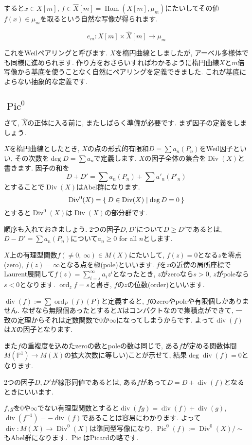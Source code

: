 \documentclass{jsarticle}
\newcommand{\PP}{\mathbb{P}}
\newcommand{\makeop}[1]{\mathop{\mathrm{#1}}\nolimits}
\def\Hom{\makeop{Hom}}
\def\Pic{\makeop{Pic}}
\def\Div{\makeop{Div}}
\def\div{\makeop{div}}
\def\ord{\makeop{ord}}
\theoremstyle{definition}
\numberwithin{theorem}{section}
\begin{document}
すると$x \in X[m]$, $f \in \hat{X}[m] = \Hom(X[m], \mu_m)$にたいしてその値$f(x) \in \mu_m$を取るという自然な写像が得られます.

\begin{equation*}
e_m: X[m] \times \hat{X}[m] \rightarrow \mu_m
\end{equation*}

これをWeilペアリングと呼びます. $X$を楕円曲線としましたが, アーベル多様体でも同様に進められます. 作り方をおさらいすればわかるように楕円曲線$X$と$m$倍写像から基底を使うことなく自然にペアリングを定義できました. これが基底によらない抽象的な定義です.

\subsection{$\Pic^0$}
さて, $\hat{X}$の正体に入る前に, またしばらく準備が必要です. まず因子の定義をしましょう.

$X$を楕円曲線としたとき, $X$の点の形式的有限和$D = \sum a_n(P_n)$をWeil因子といい, その次数を$\deg D = \sum a_n$で定義します. $X$の因子全体の集合を$\Div(X)$と書きます.
因子の和を
\[
D + D' = \sum a_n(P_n) + \sum a'_n (P'_n)
\]
とすることで$\Div(X)$はAbel群になります.
\[
\Div^0(X) = \Set{D \in \Div(X) | \deg D = 0}
\]
とすると$\Div^0(X)$は$\Div(X)$の部分群です.

順序も入れておきましょう. 2つの因子$D, D'$について$D \geq D'$であるとは, $D - D' = \sum a_n(P_n)$について$a_n \geq 0$ for all $n$とします.

$X$上の有理型関数$f(\neq 0,\ \infty) \in M(X)$にたいして, $f(z) = 0$となる$z$を零点(zero), $f(z) = \infty$となる点を極(pole)といいます. $f$を$z$の近傍の局所座標でLaurent展開して$f(z) = \sum_{i=s}^\infty a_iz^i$となったとき, $z$がzeroなら$s > 0$, $z$がpoleなら$s < 0$となります. $\ord_z f = s$と書き, $f$の$z$の位数(order)といいます.

$\div(f) := \sum \ord_P(f) (P)$と定義すると, $f$のzeroやpoleや有限個しかありません. なぜなら無限個あったとすると$X$はコンパクトなので集積点ができて, 一致の定理からそれは定数関数で0か$\infty$になってしまうからです. よって$\div(f)$は$X$の因子となります.

また$f$の重複度を込めたzeroの数とpoleの数は同じで, ある$f$が定める関数体間$M(\PP^1) \rightarrow M(X)$の拡大次数に等しい)ことが示せて, 結果$\deg \div(f) = 0$となります.

2つの因子$D, D'$が線形同値であるとは, ある$f$があって$D = D + \div(f)$となるときにいいます.

$f, g$を0や$\infty$でない有理型関数とすると$\div(fg) = \div(f) + \div(g)$, $\div(f^{-1}) = -\div(f)$であることは容易にわかります. よって $\div: M(X) \rightarrow \Div^0(X)$は準同型写像になり, $\Pic^0(f) := \Div^0(X)/\sim$もAbel群になります. $\Pic$はPicardの略です.
\end{document}

